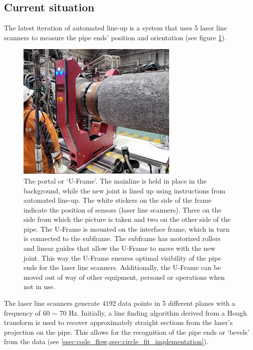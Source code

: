 \subsection{Current situation}
The latest iteration of automated line-up is a system that uses 5 laser line scanners to measure the pipe ends' position and orientation
(see figure \ref{fig:portal}).
\begin{figure}[H]
      \centering
      \includegraphics[width=0.7\textwidth]{images/side_view_final_lineup.jpg}
      \caption{The portal or `U-Frame'. The mainline is held in place in the background,
            while the new joint is lined up using instructions from automated line-up.
            The white stickers on the side of the frame indicate the position of sensors (laser line scanners). Three on the side from which the picture is taken and two on the other side of the pipe. The U-Frame is mounted on the interface frame, which in turn is connected to the subframe. The subframe has motorized rollers and linear guides that allow the U-Frame to move with the new joint. This way the U-Frame ensures optimal visibility of the pipe ends for the laser line scanners. Additionally, the U-Frame can be moved out of way of other equipment, personel or operations when not in use.}
      \label{fig:portal}
\end{figure}

The laser line scanners generate 4192 data points in 5 different planes with a frequency of 60 $\sim$ 70 Hz. Initially, a line finding algorithm derived from a Hough transform \cite{hough_transform} is used to recover approximately straight sections from the laser's projection on the pipe. This allows for the recognition of the pipe ends or `bevels' from the data (see \cref{ssec:code_flow,ssec:circle_fit_implementation}).

